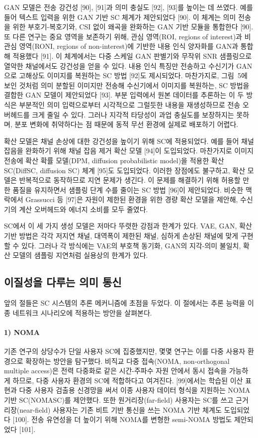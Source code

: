 GAN 모델은 전송 강건성 [90], [91]과 의미 충실도 [92], [93]를 높이는 데 쓰였다.
예를 들어 텍스트 입력을 위한 GAN 기반 SC 체계가 제안되었다 [90].
이 체계는 의미 전송을 위한 부호기-복호기와, CSI 없이 왜곡을 완화하는 GAN 기반 모듈을 통합한다 [90].
또 다른 연구는 중요 영역을 보존하기 위해, 관심 영역(ROI, regions of interest)과 비관심 영역(RONI, regions of non-interest)에 기반한 내용 인식 양자화를 GAN과 통합해 적용했다 [91].
이 체계에서는 다중 스케일 GAN 판별기와 무작위 SNR 샘플링으로 열악한 채널에서도 강건성을 얻을 수 있다.
내용 인식 특징만 전송하고 수신기가 GAN으로 고해상도 이미지를 복원하는 SC 방법 [92]도 제시되었다.
마찬가지로, 그림~5에 보인 것처럼 의미 분할된 이미지만 전송해 수신기에서 이미지를 복원하는, SC 방법을 결합한 GAN 모델이 제안되었다 [93].
부분 입력에서 원본 데이터를 추론하는 이 두 방식은 부분적인 의미 입력으로부터 시각적으로 그럴듯한 내용을 재생성하므로 전송 오버헤드를 크게 줄일 수 있다.
그러나 지각적 타당성이 과업 충실도를 보장하지는 못하며, 분포 변화에 취약하다는 점 때문에 동적 무선 환경에 실제로 배포하기 어렵다.

확산 모델은 채널 손상에 대한 강건성을 높이기 위해 SC에 적용되었다.
예를 들어 채널 잡음을 완화하기 위해 채널 잡음 제거 확산 모델 [94]이 도입되었다.
마찬가지로 이미지 전송에 확산 확률 모델(DPM, diffusion probabilistic model)을 적용한 확산 SC(DiffSC, diffusion SC) 체계 [95]도 도입되었다.
이러한 장점에도 불구하고, 확산 모델은 반복적으로 동작하므로 지연 문제가 생긴다.
이 문제를 해결하기 위해 허용할 만한 품질을 유지하면서 샘플링 단계 수를 줄이는 SC 방법 [96]이 제안되었다.
비슷한 맥락에서 Grassucci 등 [97]은 자원이 제한된 환경을 위한 경량 확산 모델을 제안해, 수신기의 계산 오버헤드와 에너지 소비를 모두 줄였다.

SC에서 이 세 가지 생성 모델은 저마다 뚜렷한 강점과 한계가 있다.
VAE, GAN, 확산 기반 방법은 각각 저지연 채널, 대역폭이 제한된 채널, 심하게 손상된 채널에 맞게 구현할 수 있다.
그러나 각 방식에는 VAE의 부호책 동기화, GAN의 지각-의미 불일치, 확산 모델의 샘플링 지연처럼 실용상의 한계가 있다.

\subsection{이질성을 다루는 의미 통신}

앞의 절들은 SC 시스템의 추론 메커니즘에 초점을 두었다.
이 절에서는 추론 능력을 이종 네트워크 시나리오에 적용하는 방안을 살펴본다.

\paragraph{1) NOMA}
기존 연구의 상당수가 단일 사용자 SC에 집중했지만, 몇몇 연구는 이를 다중 사용자 환경으로 확장하는 방안을 탐구했다.
비직교 다중 접속(NOMA, non-orthogonal multiple access)은 전력 다중화로 같은 시간-주파수 자원 안에서 동시 접속을 가능하게 하므로, 다중 사용자 환경의 SC에 적합하다고 여겨진다.
[99]에서는 학습된 이산 표현과 다중 사용자 검출용 신경망을 써서 이종 사용자 데이터 형식을 지원하는 NOMA 기반 SC(NOMASC)를 제안했다.
또한 원거리장(far-field) 사용자는 SC를 쓰고 근거리장(near-field) 사용자는 기존 비트 기반 통신을 쓰는 NOMA 기반 체계도 도입되었다 [100].
전송 유연성을 더 높이기 위해 NOMA를 변형한 semi-NOMA 방법도 제안되었다 [101].

